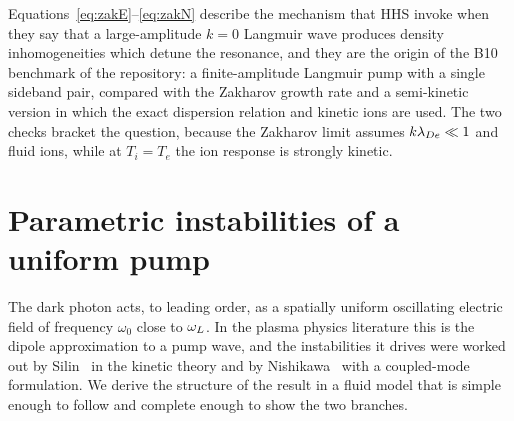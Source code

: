 Equations~\eqref{eq:zakE}--\eqref{eq:zakN} describe the mechanism that HHS invoke when they say that a large-amplitude $k=0$ Langmuir wave produces density inhomogeneities which detune the resonance, and they are the origin of the B10 benchmark of the repository: a finite-amplitude Langmuir pump with a single sideband pair, compared with the Zakharov growth rate and a semi-kinetic version in which the exact dispersion relation and kinetic ions are used. The two checks bracket the question, because the Zakharov limit assumes $k\lambda_{De}\ll1$ and fluid ions, while at $T_i=T_e$ the ion response is strongly kinetic.

\section{Parametric instabilities of a uniform pump}\label{sec:parametric}

The dark photon acts, to leading order, as a spatially uniform oscillating electric field of frequency $\omega_0$ close to $\omega_L$. In the plasma physics literature this is the dipole approximation to a pump wave, and the instabilities it drives were worked out by Silin~\citep{Silin1965} in the kinetic theory and by Nishikawa~\citep{Nishikawa1968a,Nishikawa1968b} with a coupled-mode formulation. We derive the structure of the result in a fluid model that is simple enough to follow and complete enough to show the two branches.

